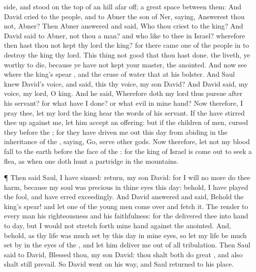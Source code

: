 {side, and
stood on the
top of an
hill afar
off; a
great
space
{} between them:
And
David
cried to the
people, and to
Abner the
son of
Ner,
saying,
Answerest thou not,
Abner? Then
Abner
answered and
said, Who
{} thou
{}
criest to the
king?
And
David
said to
Abner,
{} not thou a
{}
man? and who
{} like to thee in
Israel? wherefore then hast thou not
kept thy
lord the
king? for there
came
one of the
people in to
destroy the
king thy
lord.
This
thing
{} not
good that thou hast
done.
{} the
{}
liveth, ye
{}
worthy to
die, because ye have not
kept your
master, the
{}
anointed. And now
see where the
king’s
spear
{}, and the
cruse of
water that
{} at his
bolster.
And
Saul
knew
David’s
voice, and
said,
{} this thy
voice, my
son
David? And
David
said,
{} my
voice, my
lord, O
king.
And he
said, Wherefore doth my
lord thus
pursue
after his
servant? for what have I
done? or what
evil
{} in mine
hand?
Now therefore, I pray thee, let my
lord the
king
hear the
words of his
servant. If the
{} have stirred thee
up against me, let him
accept an
offering: but if
{} the
children of
men,
cursed
{} they
before the
{}; for they have
driven me out this
day from
abiding in the
inheritance of the
{},
saying,
Go,
serve
other
gods.
Now therefore, let not my
blood
fall to the
earth before the
face of the
{}: for the
king of
Israel is come
out to
seek
a
flea, as when one doth
hunt a
partridge in the
mountains.
\par }{\PP {}¶ Then
said
Saul, I have
sinned:
return, my
son
David: for I will no more do thee
harm, because my
soul was
precious in thine
eyes this
day: behold, I have played the
fool, and have
erred
exceedingly.
And
David
answered and
said, Behold the
king’s
spear! and let
one of the young
men come
over and
fetch it.
The
{}
render to every
man his
righteousness and his
faithfulness: for the
{}
delivered thee into
{}
hand to
day, but I
would not stretch
forth mine
hand against the
{}
anointed.
And, behold, as thy
life was much set
by this
day in mine
eyes, so let my
life be much set
by in the
eyes of the
{}, and let him
deliver me out of all
tribulation.
Then
Saul
said to
David,
Blessed
{} thou, my
son
David: thou shalt both
do
great
{}, and also shalt
still
prevail. So
David
went on his
way, and
Saul
returned to his
place.

}
